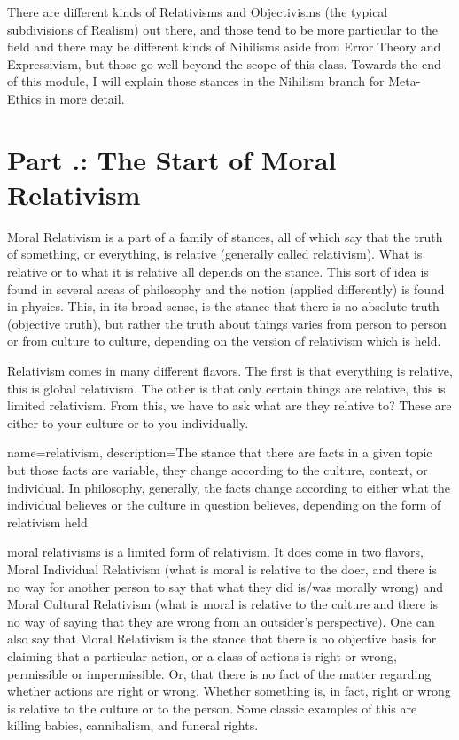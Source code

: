 There are different kinds of Relativisms and Objectivisms (the typical subdivisions of Realism) out there, and those tend to be more particular to the field and there may be different kinds of Nihilisms aside from Error Theory and Expressivism, but those go well beyond the scope of this class. Towards the end of this module, I will explain those stances in the Nihilism branch for Meta-Ethics in more detail.

\section{Part \thechapcount.\theseccount: The Start of Moral Relativism}

Moral Relativism is a part of a family of stances, all of which say that the truth of something, or everything, is relative (generally called \Gls{relativism}). What is relative or to what it is relative all depends on the stance. This sort of idea is found in several areas of philosophy and the notion (applied differently) is found in physics. This, in its broad sense, is the stance that there is no absolute truth (objective truth), but rather the truth about things varies from person to person or from culture to culture, depending on the version of relativism which is held.

Relativism comes in many different flavors. The first is that everything is relative, this is global relativism. The other is that only certain things are relative, this is limited relativism. From this, we have to ask what are they relative to? These are either to your culture or to you individually.

{
  name=relativism,
  description={The stance that there are facts in a given topic but those facts are variable, they change according to the culture, context, or individual. In philosophy, generally, the facts change according to either what the individual believes or the culture in question believes, depending on the form of relativism held}
}


\Glspl{moral relativism} is a limited form of relativism. It does come in two flavors, Moral Individual Relativism (what is moral is relative to the doer, and there is no way for another person to say that what they did is/was morally wrong) and Moral Cultural Relativism (what is moral is relative to the culture and there is no way of saying that they are wrong from an outsider's perspective). One can also say that Moral Relativism is the stance that there is no objective basis for claiming that a particular action, or a class of actions is right or wrong, permissible or impermissible. Or, that there is no fact of the matter regarding whether actions are right or wrong. Whether something is, in fact, right or wrong is relative to the culture or to the person. Some classic examples of this are killing babies, cannibalism, and funeral rights.

